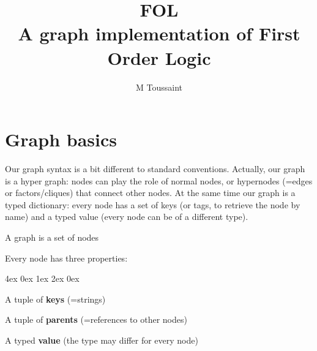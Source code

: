 \documentclass[10pt,fleqn,twoside]{article}
\title{FOL\\A graph implementation of First Order Logic}
\author{M Toussaint}
\newenvironment{items}{
\par\small
\begin{list}{--}{\leftmargin4ex \rightmargin0ex \labelsep1ex \labelwidth2ex
\topsep0pt \parsep0ex \itemsep3pt}
}{
\end{list}
}
\begin{document}
\maketitle

\section{Graph basics}

Our graph syntax is a bit different to standard conventions. Actually,
our graph is a hyper graph: nodes can play the role of normal nodes,
or hypernodes (=edges or factors/cliques) that connect other nodes. At
the same time our graph is a typed dictionary: every node has a set of
keys (or tags, to retrieve the node by name) and a typed value (every
node can be of a different type).
\begin{itemize}
\item A graph is a set of nodes
\item Every node has three properties:
\begin{items}
\item A tuple of \textbf{keys} (=strings)
\item A tuple of \textbf{parents} (=references to other nodes)
\item A typed \textbf{value} (the type may differ for every node)
\end{items}
\end{itemize}
\end{document}
